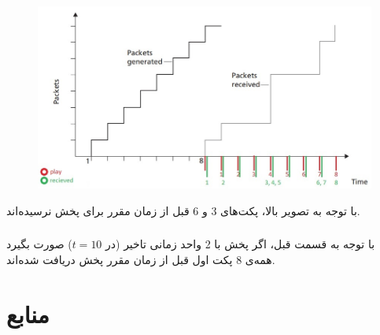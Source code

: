 \documentclass{article}
\begin{document}
\subsubsection{}
\begin{figure}[H]
    \centering
    \includegraphics[width=1.0\textwidth]{figures/11c.jpg}
    \caption
	{}
    \label{fig:fig1}
\end{figure}
با توجه به تصویر بالا، پکت‌های 3 و 6 قبل از زمان مقرر برای پخش نرسیده‌اند.

\subsubsection{}
با توجه به قسمت قبل، اگر پخش با 2 واحد زمانی تاخیر (در $t=10$) صورت بگیرد همه‌ی 8 پکت اول قبل از زمان مقرر پخش دریافت شده‌اند.

\section*{منابع}
\renewcommand{\section}[2]{}%
\begin{thebibliography}{99} %


\begin{LTRitems}

\resetlatinfont

\end{LTRitems}

\end{thebibliography}
\end{document}
